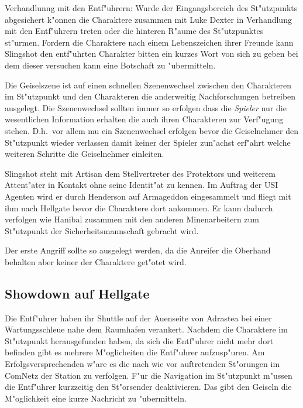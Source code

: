 Verhandlunng mit den Entf"uhrern: Wurde der Eingangsbereich des St"utzpunkts abgesichert k"onnen die Charaktere zusammen mit Luke Dexter in Verhandlung mit den Entf"uhrern treten oder die hinteren R"aume des St"utzpunktes st"urmen. Fordern die Charaktere nach einem Lebenszeichen ihrer Freunde kann Slingshot den entf"uhrten Charakter bitten ein kurzes Wort von sich zu geben bei dem dieser versuchen kann eine Botschaft zu "ubermitteln.

\begin{remarks}
	Die Geiselszene ist auf einen schnellen Szenenwechsel zwischen den Charakteren im St"utzpunkt und den Charakteren die anderweitig Nachforschungen betreiben ausgelegt. Die Szenenwechsel sollten immer so erfolgen dass die \emph{Spieler} nur die wesentlichen Information erhalten die auch ihren Charakteren zur Verf"ugung stehen. D.h.~vor allem mu\3 ein Szenenwechsel erfolgen bevor die Geiselnehmer den St"utzpunkt wieder verlassen damit keiner der Spieler zun"achst erf"ahrt welche weiteren Schritte die Geiselnehmer einleiten.

	Slingshot steht mit Artisan dem Stellvertreter des Protektors und weiterem Attent"ater in Kontakt ohne seine Identit"at zu kennen. Im Auftrag der USI Agenten wird er durch Henderson auf Armageddon eingesammelt und fliegt mit ihm nach Hellgate bevor die Charaktere dort ankommen. Er kann dadurch verfolgen wie Hanibal zusammen mit den anderen Minenarbeitern zum St"utzpunkt der Sicherheitsmannschaft gebracht wird.

	Der erste Angriff sollte so ausgelegt werden, da\3 die Anreifer die Oberhand behalten aber keiner der Charaktere get"otet wird.
\end{remarks}


\subsection{Showdown auf Hellgate}

Die Entf"uhrer haben ihr Shuttle auf der Au\3enseite von Adrastea bei einer Wartungsschleu\3e nahe dem Raumhafen verankert. Nachdem die Charaktere im St"utzpunkt herausgefunden haben, da\3 sich die Entf"uhrer nicht mehr dort befinden gibt es mehrere M"oglicheiten die Entf"uhrer aufzusp"uren. Am Erfolgsversprechenden w"are es die nach wie vor auftretenden St"orungen im ComNetz der Station zu verfolgen. F"ur die Navigation im St"utzpunkt m"ussen die Entf"uhrer kurzzeitig den St"orsender deaktivieren. Das gibt den Geiseln die M"oglichkeit eine kurze Nachricht zu "ubermitteln.

